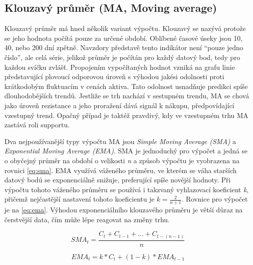 \subsection{Klouzavý průměr (MA, Moving average)}
Klouzavý průměr má hned několik variant výpočtu. Klouzavý se nazývá protože se jeho hodnota počítá pouze za určené období. Oblíbené časové úseky jsou 10, 40, nebo 200 dní zpětně.
Navzdory představě tento indikátor není \enquote{pouze jedno číslo}, ale celá série, jelikož průměr je počítán pro každý datový bod, tedy pro každou svíčku zvlášť. Propojením vypočítaných
hodnot vzniká na grafu linie představující plovoucí odporovou úroveň s výhodou jakési odolnosti proti krátkodobým fluktuacím v cenách aktiva. Tato odolnost usnadňuje predikci spíše dlouhodobějších trendů.
Jestliže se trh nachází v sestupném trendu, MA se chová jako úroveň rezistance a jeho proražení dává signál k nákupu, předpovídající vzestupný trend.
Opačný případ je taktéž pravdivý, kdy ve vzestupném trhu MA zastává roli supportu.

Dva nejpoužívanější typy výpočtu MA jsou \emph{Simple Moving Average (SMA)} a \emph{Exponential Moving Average (EMA)}. SMA je jednoduchý pro výpočet a jedná se o obyčejný průměr na období
o velikosti \emph{n} a způsob výpočtu je vyobrazena na rovnici \ref{eq:sma}. EMA využívá váženého průměru, ve kterém se váha starších datový bodů se exponenciálně snižuje, preferující spíše novější hodnoty.
Při výpočtu tohoto váženého průměru se používá i takzvaný vyhlazovací koeficient \emph{k}, přičemž nejčastější nastavení tohoto koeficientu je $ k = \frac{2}{n+1}$.
Rovnice pro výpočet je na \ref{eq:ema}. Výhodou exponenciálního klouzavého průměru je větší důraz na čerstvější data, čím může lépe reagovat na změny trhu.

\begin{equation}
    SMA_t = \frac{C_t + C_{t - 1} + ... + C_{t - (n - 1)}}{n}
    \label{eq:sma}
\end{equation}

\begin{equation}
    EMA_t = k * C_t + (1 - k) * EMA_{t - 1}
    \label{eq:ema}
\end{equation}


